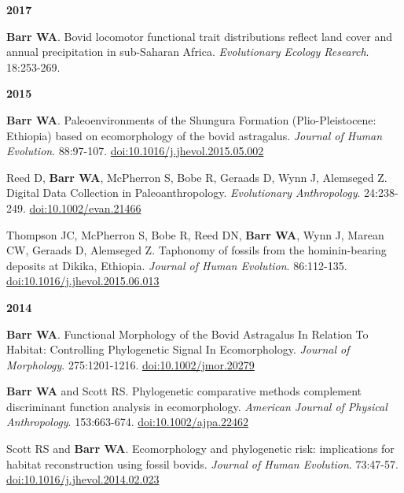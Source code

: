 \documentclass{article}
\begin{document}
\begin{description*}
\item[] {\bfseries 2017}
\item[] {\bfseries Barr WA}. Bovid locomotor functional trait distributions reflect land cover and annual precipitation in sub-Saharan Africa. \emph{Evolutionary Ecology Research}. 18:253-269.
\end{description*}

\begin{description*}
\begin{minipage}{\linewidth}
\item[] {\bfseries 2015}
\item[] {\bfseries Barr WA}. Paleoenvironments of the Shungura Formation (Plio-Pleistocene: Ethiopia) based on ecomorphology of the bovid astragalus. \emph{Journal of Human Evolution}. 88:97-107. \href{http://dx.doi.org/10.1016/j.jhevol.2015.05.002}{doi:10.1016/j.jhevol.2015.05.002}
\end{minipage}
\item Reed D, {\bfseries Barr WA}, McPherron S, Bobe R, Geraads D, Wynn J, Alemseged Z. Digital Data Collection in Paleoanthropology. \emph{Evolutionary Anthropology}. 24:238-249. \href{http://dx.doi.org/10.1002/evan.21466}{doi:10.1002/evan.21466}
\item[] Thompson JC, McPherron S, Bobe R, Reed DN, {\bfseries Barr WA}, Wynn J, Marean CW, Geraads D, Alemseged Z. Taphonomy of fossils from the hominin-bearing deposits at Dikika, Ethiopia. \emph{Journal of Human Evolution}. 86:112-135. \href{http://dx.doi.org/10.1016/j.jhevol.2015.06.013}{doi:10.1016/j.jhevol.2015.06.013}


\end{description*}

\begin{description*}
\item[] {\bfseries 2014}
\item[] {\bfseries Barr WA}. Functional Morphology of the Bovid Astragalus In Relation To Habitat: Controlling Phylogenetic Signal In Ecomorphology. \emph{Journal
of Morphology}. 275:1201-1216. \href{http://dx.doi.org/10.1002/jmor.20279}{doi:10.1002/jmor.20279}

\item[] {\bfseries Barr WA} and Scott RS. Phylogenetic comparative methods complement discriminant function analysis in ecomorphology. \emph{American Journal
of Physical Anthropology}. 153:663-674. \href{http://dx.doi.org/10.1002/ajpa.22462}{doi:10.1002/ajpa.22462}

\item[] Scott RS and {\bfseries Barr WA}. Ecomorphology and phylogenetic risk: implications for habitat reconstruction using fossil bovids.
\emph{Journal of Human Evolution}. 73:47-57. \href{http://dx.doi.org/10.1016/j.jhevol.2014.02.023}{doi:10.1016/j.jhevol.2014.02.023}

\end{description*}
\end{document}
